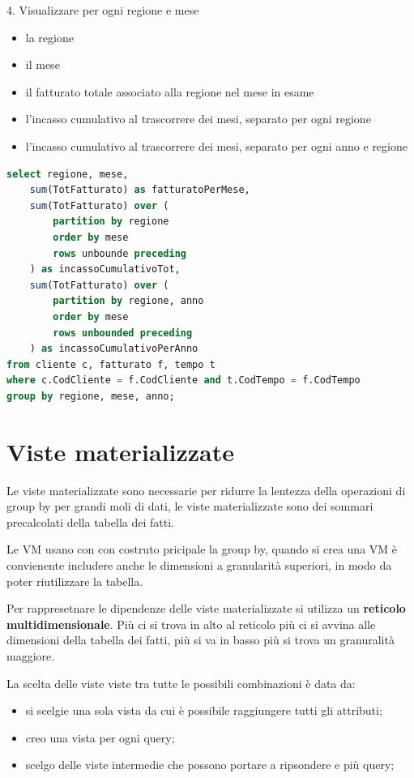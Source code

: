 \documentclass[12pt]{article}
\begin{document}
4. Visualizzare per ogni regione e mese
\begin{itemize}
    \item la regione
    \item il mese
    \item il fatturato totale associato alla regione nel mese in esame
    \item l’incasso cumulativo al trascorrere dei mesi, separato per ogni regione
    \item l’incasso cumulativo al trascorrere dei mesi, separato per ogni anno e regione
\end{itemize}
\begin{lstlisting}[language=sql]
select regione, mese,
    sum(TotFatturato) as fatturatoPerMese,
    sum(TotFatturato) over (
        partition by regione
        order by mese
        rows unbounde preceding
    ) as incassoCumulativoTot,
    sum(TotFatturato) over (
        partition by regione, anno
        order by mese
        rows unbounded preceding
    ) as incassoCumulativoPerAnno
from cliente c, fatturato f, tempo t
where c.CodCliente = f.CodCliente and t.CodTempo = f.CodTempo
group by regione, mese, anno;
\end{lstlisting}



\newpage
\section{Viste materializzate}
Le viste materializzate sono necessarie per ridurre la lentezza della operazioni di group by per grandi moli di dati, le viste materializzate sono dei sommari precalcolati della tabella dei fatti.

Le VM usano con con costruto pricipale la group by, quando si crea una VM \`e convienente includere anche le dimensioni a granularit\`a superiori, in modo da poter riutilizzare la tabella.

Per rappresetnare le dipendenze delle viste materializzate si utilizza un \textbf{reticolo multidimensionale}. Pi\`u ci si trova in alto al reticolo pi\`u ci si avvina alle dimensioni della tabella dei fatti, pi\`u si va in basso pi\`u si trova un granuralit\`a maggiore.

La scelta delle viste viste tra tutte le possibili combinazioni \`e data da:
\begin{itemize}
    \item si scelgie una sola vista da cui \`e possibile raggiungere tutti gli attributi;
    \item creo una vista per ogni query;
    \item scelgo delle viste intermedie che possono portare a ripsondere e pi\`u query;
\end{itemize}
\end{document}
